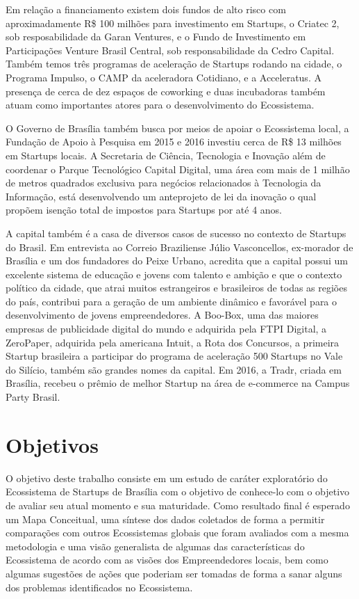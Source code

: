 Em relação a financiamento existem dois fundos de alto risco com aproximadamente R\$ 100 milhões para investimento em Startups, o Criatec 2, sob resposabilidade da Garan Ventures, e o Fundo de Investimento em Participações Venture Brasil Central, sob responsabilidade da Cedro Capital. Também temos três programas de aceleração de Startups rodando na cidade, o Programa Impulso, o CAMP da aceleradora Cotidiano, e a Acceleratus. A presença de cerca de dez espaços de coworking e duas incubadoras também atuam como importantes atores para o desenvolvimento do Ecossistema.

O Governo de Brasília também busca por meios de apoiar o Ecossistema local, a Fundação de Apoio à Pesquisa em 2015 e 2016 investiu cerca de R\$ 13 milhões em Startups locais. A Secretaria de Ciência, Tecnologia e Inovação além de coordenar o Parque Tecnológico Capital Digital, uma área com mais de 1 milhão de metros quadrados exclusiva para negócios relacionados à Tecnologia da Informação, está desenvolvendo um anteprojeto de lei da inovação o qual propõem isenção total de impostos para Startups por até 4 anos. 

A capital também é a casa de diversos casos de sucesso no contexto de Startups do Brasil. Em entrevista ao Correio Braziliense Júlio Vasconcellos, ex-morador de Brasília e um dos fundadores do Peixe Urbano, acredita que a capital possui um excelente sistema de educação e jovens com talento e ambição e que o contexto político da cidade, que atrai muitos estrangeiros e brasileiros de todas as regiões do país, contribui para a geração de um ambiente dinâmico e favorável para o desenvolvimento de jovens empreendedores. A Boo-Box, uma das maiores empresas de publicidade digital do mundo e adquirida pela FTPI Digital, a ZeroPaper, adquirida pela americana Intuit, a Rota dos Concursos, a primeira Startup brasileira a participar do programa de aceleração 500 Startups no Vale do Silício, também são grandes nomes da capital. Em 2016, a Tradr, criada em Brasília, recebeu o prêmio de melhor Startup na área de e-commerce na Campus Party Brasil.

\section{Objetivos}
\label{section:objetivos}

O objetivo deste trabalho consiste em um estudo de caráter exploratório do Ecossistema de Startups de Brasília com o objetivo de conhece-lo com o objetivo de avaliar seu atual momento e sua maturidade. Como resultado final é esperado um Mapa Conceitual, uma síntese dos dados coletados de forma a permitir comparações com outros Ecossistemas globais que foram avaliados com a mesma metodologia e uma visão generalista de algumas das características do Ecossistema de acordo com as visões dos Empreendedores locais, bem como algumas sugestões de ações que poderiam ser tomadas de forma a sanar alguns dos problemas identificados no Ecossistema.

